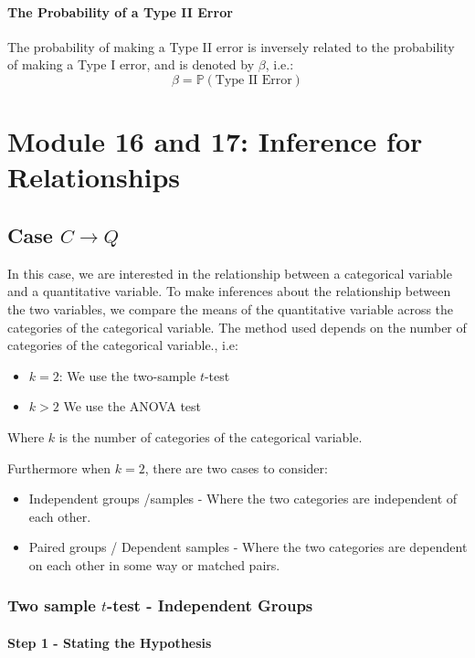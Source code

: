 \documentclass[12pt letter]{report}
\begin{document}
\subsubsection{The Probability of a Type II Error}

The probability of making a Type II error is inversely related to the probability of making a Type I error, and is denoted by $\beta $, i.e.:
\[
  \beta = \mathbb{P}\left( \text{Type II Error} \right)
\]

\chapter{Module 16 and 17: Inference for Relationships}


\section{Case $C \to Q$}

In this case, we are interested in the relationship between a categorical variable and a quantitative variable. To make
inferences about the relationship between the two variables, we compare the means of the quantitative variable across the
categories of the categorical variable. The method used depends on the number of categories of the categorical
variable., i.e:
\begin{itemize}
  \item $k = 2$: We use the two-sample $t$-test
  \item $k > 2$ We use the ANOVA test
\end{itemize}
Where $k$ is the number of categories of the categorical variable.

Furthermore when $k = 2$, there are two cases to consider:
\begin{itemize}
  \item Independent groups /samples - Where the two categories are independent of each other.
  \item Paired groups / Dependent samples - Where the two categories are dependent on each other in some way or matched pairs.
\end{itemize}

\subsection{Two sample $t$-test - Independent Groups}

\subsubsection{Step 1 - Stating the Hypothesis}
\end{document}
